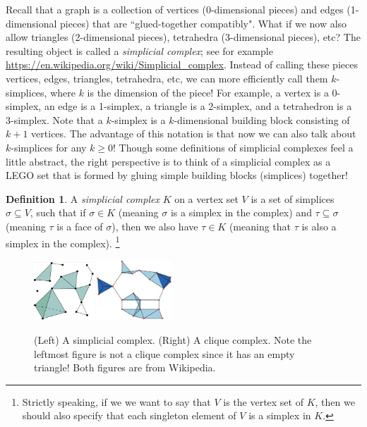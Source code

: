 \documentclass[amscd, amssymb, verbatim]{amsart}[12pt]
\theoremstyle{plain}
\theoremstyle{definition}
\newtheorem{definition}[lemma]{Definition}
\begin{document}
Recall that a graph is a collection of vertices (0-dimensional pieces) and edges (1-dimensional pieces) that are ``glued-together compatibly".
What if we now also allow triangles (2-dimensional pieces), tetrahedra (3-dimensional pieces), etc? The resulting object is called a \emph{simplicial complex}; see for example \url{https://en.wikipedia.org/wiki/Simplicial\_complex}. 
Instead of calling these pieces vertices, edges, triangles, tetrahedra, etc, we can more efficiently call them $k$-simplices, where $k$ is the dimension of the piece!
For example, a vertex is a 0-simplex, an edge is a 1-simplex, a triangle is a 2-simplex, and a tetrahedron is a 3-simplex. Note that a $k$-simplex is a $k$-dimensional building block consisting of $k+1$ vertices. The advantage of this notation is that now we can also talk about $k$-simplices for any $k\ge 0$!
Though some definitions of simplicial complexes feel a little abstract, the right perspective is to think of a simplicial complex as a LEGO set that is formed by gluing simple building blocks (simplices) together!

\begin{definition}
A \emph{simplicial complex} $K$ on a vertex set $V$ is a set of simplices $\sigma \subseteq V$, such that if $\sigma\in K$ (meaning $\sigma$ is a simplex in the complex) and $\tau\subseteq\sigma$ (meaning $\tau$ is a face of $\sigma$), then we also have $\tau\in K$ (meaning that $\tau$ is also a simplex in the complex).
\footnote{Strictly speaking, if we we want to say that $V$ is the vertex set of $K$, then we should also specify that each singleton element of $V$ is a simplex in $K$.}
\end{definition}

\begin{figure}[h]
\centering
\includegraphics[width=0.2\textwidth]{SimplicialComplex.png}
\hspace{20mm}
\includegraphics[width=0.25\textwidth]{CliqueComplex.png}
\caption{(Left) A simplicial complex. (Right) A clique complex.
Note the leftmost figure is not a clique complex since it has an empty triangle!
Both figures are from Wikipedia.}
\label{fig:simplicialComplex}
\end{figure}
\end{document}
